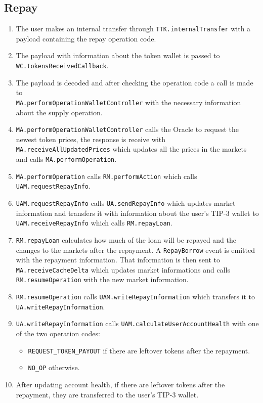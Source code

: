 \subsection{Repay}
\begin{enumerate}
  \item The user makes an internal transfer through \verb|TTK.internalTransfer| with a payload containing the repay operation code.
  \item The payload with information about the token wallet is passed to \\\verb|WC.tokensReceivedCallback|.
  \item The payload is decoded and after checking the operation code a call is made to \\\verb|MA.performOperationWalletController| with the necessary information about the supply operation.
  \item \verb|MA.performOperationWalletController| calls the Oracle to request the newest token prices, the response is receive with \verb|MA.receiveAllUpdatedPrices| which updates all the prices in the markets and calls \verb|MA.performOperation|.
  \item \verb|MA.performOperation| calls \verb|RM.performAction| which calls \verb|UAM.requestRepayInfo|.
  \item \verb|UAM.requestRepayInfo| calls \verb|UA.sendRepayInfo| which updates market information and transfers it with information about the user's TIP-3 wallet to \verb|UAM.receiveRepayInfo| which calls \verb|RM.repayLoan|.
  \item \verb|RM.repayLoan| calculates how much of the loan will be repayed and the changes to the markets after the repayment. A \verb|RepayBorrow| event is emitted with the repayment information. That information is then sent to \verb|MA.receiveCacheDelta| which updates market informations and calls \verb|RM.resumeOperation| with the new market information.
  \item \verb|RM.resumeOperation| calls \verb|UAM.writeRepayInformation| which transfers it to \\\verb|UA.writeRepayInformation|.
  \item \verb|UA.writeRepayInformation| calls \verb|UAM.calculateUserAccountHealth| with one of the two operation codes:
  \begin{itemize}
    \item \verb|REQUEST_TOKEN_PAYOUT| if there are leftover tokens after the repayment.
    \item \verb|NO_OP| otherwise.
  \end{itemize}
  \item After updating account health, if there are leftover tokens after the repayment, they are transferred to the user's TIP-3 wallet.
\end{enumerate}

